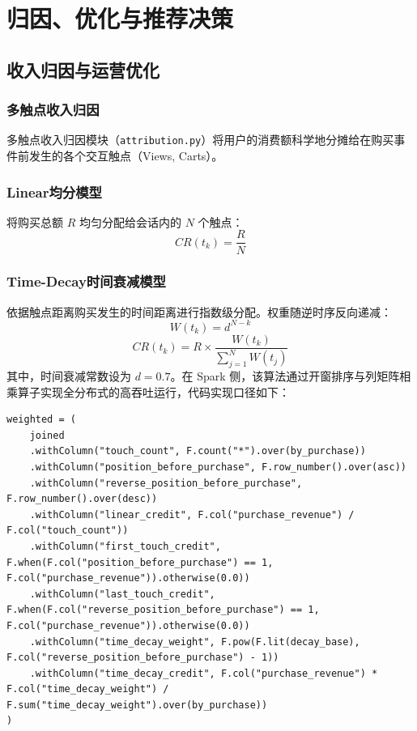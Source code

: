 \section{归因、优化与推荐决策}

\subsection{收入归因与运营优化}

\subsubsection{多触点收入归因}

多触点收入归因模块（\texttt{attribution.py}）将用户的消费额科学地分摊给在购买事件前发生的各个交互触点（Views, Carts）。

\subsubsection{Linear均分模型}

将购买总额 $R$ 均匀分配给会话内的 $N$ 个触点：
\begin{equation}
    CR(t_k) = \frac{R}{N}
\end{equation}

\subsubsection{Time-Decay时间衰减模型}

依据触点距离购买发生的时间距离进行指数级分配。权重随逆时序反向递减：
\begin{equation}
    W(t_k) = d^{N-k}
\end{equation}
\begin{equation}
    CR(t_k) = R \times \frac{W(t_k)}{\sum_{j=1}^N W(t_j)}
\end{equation}
其中，时间衰减常数设为 $d = 0.7$。在 Spark 侧，该算法通过开窗排序与列矩阵相乘算子实现全分布式的高吞吐运行，代码实现口径如下：
\begin{lstlisting}[style=codexcode]
weighted = (
    joined
    .withColumn("touch_count", F.count("*").over(by_purchase))
    .withColumn("position_before_purchase", F.row_number().over(asc))
    .withColumn("reverse_position_before_purchase", F.row_number().over(desc))
    .withColumn("linear_credit", F.col("purchase_revenue") / F.col("touch_count"))
    .withColumn("first_touch_credit", F.when(F.col("position_before_purchase") == 1, F.col("purchase_revenue")).otherwise(0.0))
    .withColumn("last_touch_credit", F.when(F.col("reverse_position_before_purchase") == 1, F.col("purchase_revenue")).otherwise(0.0))
    .withColumn("time_decay_weight", F.pow(F.lit(decay_base), F.col("reverse_position_before_purchase") - 1))
    .withColumn("time_decay_credit", F.col("purchase_revenue") * F.col("time_decay_weight") / F.sum("time_decay_weight").over(by_purchase))
)
\end{lstlisting}

